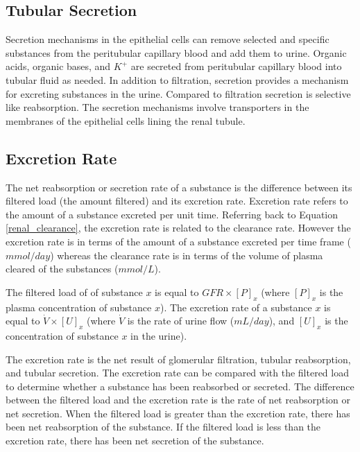 \subsection{Tubular Secretion}

Secretion mechanisms in the epithelial cells can remove selected and specific substances from the peritubular capillary blood and add them to urine. Organic acids, organic bases, and $K^+$ are secreted from peritubular capillary blood into tubular fluid as needed. In addition to filtration, secretion provides a mechanism for excreting substances in the urine. Compared to filtration secretion is selective like reabsorption. The secretion mechanisms involve transporters in the membranes of the epithelial cells lining the renal tubule.

\subsection{Excretion Rate}

The net reabsorption or secretion rate of a substance is the difference between its filtered load (the amount filtered) and its excretion rate. Excretion rate refers to the amount of a substance excreted per unit time. Referring back to Equation \ref{renal_clearance}, the excretion rate is related to the clearance rate. However the excretion rate is in terms of the amount of a substance excreted per time frame ($mmol/day$) whereas the clearance rate is in terms of the volume of plasma cleared of the substances ($mmol/L$). 

The filtered load of of substance $x$ is equal to  $GFR \times [P]_x$ (where $[P]_x$ is the plasma concentration of substance $x$). The excretion rate of a substance $x$ is equal to $\dot{V} \times [U]_x$ (where $\dot{V}$ is the rate of urine flow ($mL/day$), and $[U]_x$ is the concentration of substance $x$ in the urine). 

The excretion rate is the net result of glomerular filtration, tubular reabsorption, and tubular secretion. The excretion rate can be compared with the filtered load to determine whether a substance has been reabsorbed or secreted. The difference between the filtered load and the excretion rate is the rate of net reabsorption or net secretion. When the filtered load is greater than the excretion rate, there has been net reabsorption of the substance. If the filtered load is less than the excretion rate, there has been net secretion of the substance.

